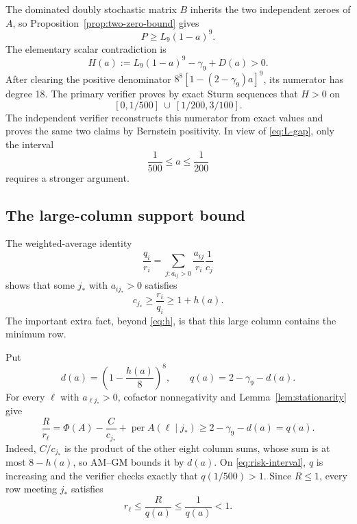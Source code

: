 \documentclass[11pt]{article}
\theoremstyle{remark}
\newcommand{\per}{\operatorname{per}}
\begin{document}
The dominated doubly stochastic matrix $B$ inherits the two independent
zeroes of $A$, so Proposition~\ref{prop:two-zero-bound} gives
\begin{equation}\label{eq:marginal-permanent}
 P\ge L_9(1-a)^9.
\end{equation}
The elementary scalar contradiction is
\begin{equation}\label{eq:H}
 H(a):=L_9(1-a)^9-\gamma_9+D(a)>0.
\end{equation}
After clearing the positive denominator $8^8[1-(2-\gamma_9)a]^9$, its
numerator has degree 18.  The primary verifier proves by exact Sturm
sequences that $H>0$ on
\begin{equation}\label{eq:safe-intervals}
 [0,1/500]\ \cup\ [1/200,3/100].
\end{equation}
The independent verifier reconstructs this numerator from exact values and
proves the same two claims by Bernstein positivity.  In view of
\eqref{eq:L-gap}, only the interval
\begin{equation}\label{eq:risk-interval}
 \frac1{500}\le a\le\frac1{200}
\end{equation}
requires a stronger argument.

\subsection{The large-column support bound}

The weighted-average identity
\[
 \frac{q_i}{r_i}=\sum_{j:a_{ij}>0}\frac{a_{ij}}{r_i}\frac1{c_j}
\]
shows that some $j_*$ with $a_{ij_*}>0$ satisfies
\begin{equation}\label{eq:distinguished-column}
 c_{j_*}\ge\frac{r_i}{q_i}\ge1+h(a).
\end{equation}
The important extra fact, beyond \eqref{eq:h}, is that this large column
contains the minimum row.

Put
\begin{equation}\label{eq:q-support}
 d(a)=\left(1-\frac{h(a)}8\right)^8,
 \qquad q(a)=2-\gamma_9-d(a).
\end{equation}
For every $\ell$ with $a_{\ell j_*}>0$, cofactor nonnegativity and
Lemma~\ref{lem:stationarity} give
\[
 \frac{R}{r_\ell}
 =\Phi(A)-\frac{C}{c_{j_*}}+\per A(\ell\mid j_*)
 \ge2-\gamma_9-d(a)=q(a).
\]
Indeed, $C/c_{j_*}$ is the product of the other eight column sums, whose sum
is at most $8-h(a)$, so AM--GM bounds it by $d(a)$.  On
\eqref{eq:risk-interval}, $q$ is increasing and the verifier checks exactly
that $q(1/500)>1$.  Since $R\le1$, every row meeting $j_*$ satisfies
\begin{equation}\label{eq:row-cap}
 r_\ell\le\frac{R}{q(a)}\le\frac1{q(a)}<1.
\end{equation}
\end{document}
